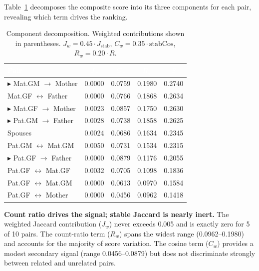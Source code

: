 \documentclass{../yalumba}
\begin{document}
Table~\ref{tab:components} decomposes the composite score into its three
components for each pair, revealing which term drives the ranking.

\begin{table}[H]
  \centering
  \tablestyle
  \caption{Component decomposition.  Weighted contributions shown in
    parentheses.  $J_w = 0.45 \cdot J_{\text{stab}}$,
    $C_w = 0.35 \cdot \text{stabCos}$, $R_w = 0.20 \cdot R$.}
  \label{tab:components}
  \begin{tabular}{lcccc}
    \toprule
    \rowcolor{table-header}
    \textcolor{white}{\textbf{Pair}} &
    \textcolor{white}{\textbf{$J_w$}} &
    \textcolor{white}{\textbf{$C_w$}} &
    \textcolor{white}{\textbf{$R_w$}} &
    \textcolor{white}{\textbf{$S$}} \\
    \midrule
    $\blacktriangleright$ Mat.GM $\to$ Mother
      & 0.0000 & 0.0759 & 0.1980 & 0.2740 \\
    Mat.GF $\leftrightarrow$ Father
      & 0.0000 & 0.0766 & 0.1868 & 0.2634 \\
    $\blacktriangleright$ Mat.GF $\to$ Mother
      & 0.0023 & 0.0857 & 0.1750 & 0.2630 \\
    $\blacktriangleright$ Pat.GM $\to$ Father
      & 0.0028 & 0.0738 & 0.1858 & 0.2625 \\
    Spouses
      & 0.0024 & 0.0686 & 0.1634 & 0.2345 \\
    Pat.GM $\leftrightarrow$ Mat.GM
      & 0.0050 & 0.0731 & 0.1534 & 0.2315 \\
    $\blacktriangleright$ Pat.GF $\to$ Father
      & 0.0000 & 0.0879 & 0.1176 & 0.2055 \\
    Pat.GF $\leftrightarrow$ Mat.GF
      & 0.0032 & 0.0705 & 0.1098 & 0.1836 \\
    Pat.GF $\leftrightarrow$ Mat.GM
      & 0.0000 & 0.0613 & 0.0970 & 0.1584 \\
    Pat.GF $\leftrightarrow$ Mother
      & 0.0000 & 0.0456 & 0.0962 & 0.1418 \\
    \bottomrule
  \end{tabular}
\end{table}

\begin{keyfinding}
\textbf{Count ratio drives the signal; stable Jaccard is nearly inert.}
The weighted Jaccard contribution ($J_w$) never exceeds 0.005 and is exactly
zero for 5 of 10 pairs.  The count-ratio term ($R_w$) spans the widest range
(0.0962--0.1980) and accounts for the majority of score variation.  The cosine
term ($C_w$) provides a modest secondary signal (range 0.0456--0.0879) but
does not discriminate strongly between related and unrelated pairs.
\end{keyfinding}
\end{document}
